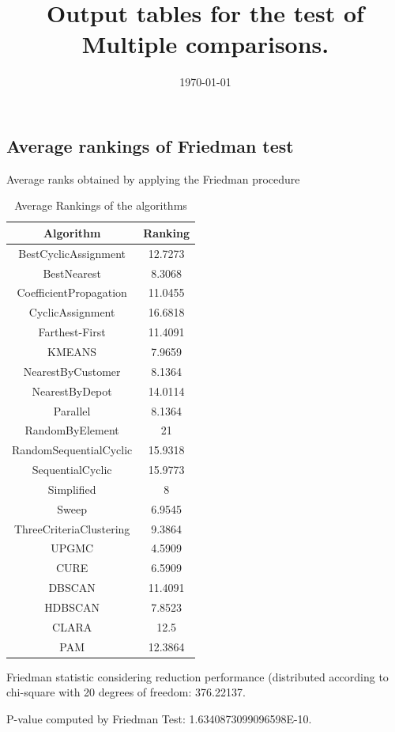 \documentclass[a4paper,10pt]{article}
\title{Output tables for the test of Multiple comparisons.}
\author{}
\date{\today}
\begin{document}
\begin{landscape}
\pagestyle{empty}
\maketitle
\thispagestyle{empty}
\section{Average rankings of Friedman test}



Average ranks obtained by applying the Friedman procedure

\begin{table}[!htp]
\centering
\begin{tabular}{|c|c|}\hline
Algorithm&Ranking\\\hline
BestCyclicAssignment & 12.7273\\
BestNearest & 8.3068\\
CoefficientPropagation & 11.0455\\
CyclicAssignment & 16.6818\\
Farthest-First & 11.4091\\
KMEANS & 7.9659\\
NearestByCustomer & 8.1364\\
NearestByDepot & 14.0114\\
Parallel & 8.1364\\
RandomByElement & 21\\
RandomSequentialCyclic & 15.9318\\
SequentialCyclic & 15.9773\\
Simplified & 8\\
Sweep & 6.9545\\
ThreeCriteriaClustering & 9.3864\\
UPGMC & 4.5909\\
CURE & 6.5909\\
DBSCAN & 11.4091\\
HDBSCAN & 7.8523\\
CLARA & 12.5\\
PAM & 12.3864\\
\hline
\end{tabular}
\caption{Average Rankings of the algorithms}
\end{table}

Friedman statistic considering reduction performance (distributed according to chi-square with 20 degrees of freedom: 376.22137.

P-value computed by Friedman Test: 1.6340873099096598E-10.\newline


\end{landscape}
\end{document}
